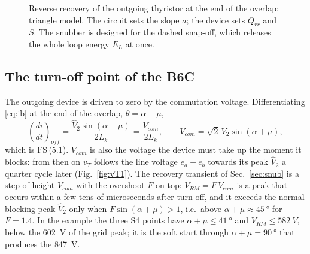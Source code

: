 \documentclass[10pt,a4paper]{scrartcl}
\newcommand{\Id}{I_{d}}
\newcommand{\Vll}{V_{2}}
\newcommand{\Lk}{L_{k}}
\newcommand{\fs}[1]{\textsf{FS}\,(#1)}
\begin{document}
\begin{figure}[htb]
\centering
{}
\caption{Reverse recovery of the outgoing thyristor at the end of the overlap: triangle model. The circuit sets the slope $a$; the device sets $Q_{rr}$ and $S$. The snubber is designed for the dashed snap-off, which releases the whole loop energy $E_L$ at once.}
\label{fig:rr}
\end{figure}

\subsection{The turn-off point of the B6C}\label{sec:turnoff}
The outgoing device is driven to zero by the commutation voltage. Differentiating \eqref{eq:ib} at the end of the overlap, $\theta = \alpha+\mu$,
\begin{equation}
\left(\frac{di}{dt}\right)_{off} = \frac{\hat V_2\sin(\alpha+\mu)}{2\Lk} = \frac{V_{com}}{2\Lk}, \qquad V_{com} = \sqrt2\,\Vll\sin(\alpha+\mu) ,
\label{eq:Vcomderiv}
\end{equation}
which is \fs{5.1}. $V_{com}$ is also the voltage the device must take up the moment it blocks: from then on $v_T$ follows the line voltage $e_a - e_b$ towards its peak $\hat V_2$ a quarter cycle later (Fig.~\ref{fig:vT1}). The recovery transient of Sec.~\ref{sec:snub} is a step of height $V_{com}$ with the overshoot $F$ on top: $V_{RM} = F\,V_{com}$ is a peak that occurs within a few tens of microseconds after turn-off, and it exceeds the normal blocking peak $\hat V_2$ only when $F\sin(\alpha+\mu) > 1$, i.e.\ above $\alpha+\mu\approx\SI{45}{\degree}$ for $F = 1.4$. In the example the three S4 points have $\alpha+\mu\le\SI{41}{\degree}$ and $V_{RM}\le\SI{582}{V}$, below the \SI{602}{V} of the grid peak; it is the soft start through $\alpha+\mu = \SI{90}{\degree}$ that produces the \SI{847}{V}.
\end{document}
